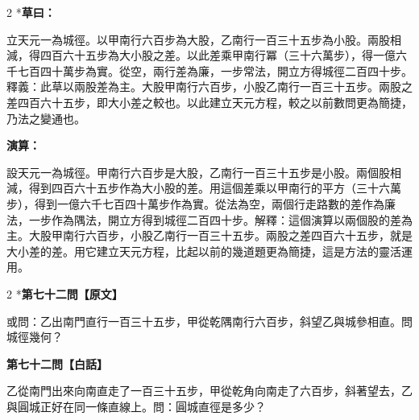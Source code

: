 \documentclass[11pt,a4paper]{article}
\begin{document}
\vspace{0.1cm}
\noindent{}
\par\vspace{0.15cm}

\begin{paracol}{2}
\switchcolumn[0]*\textbf{草曰：}

\small 立天元一為城徑。以甲南行六百步為大股，乙南行一百三十五步為小股。兩股相減，得四百六十五步為大小股之差。以此差乘甲南行冪（三十六萬步），得一億六千七百四十萬步為實。從空，兩行差為廉，一步常法，開立方得城徑二百四十步。釋義：此草以兩股差為主。大股甲南行六百步，小股乙南行一百三十五步。兩股之差四百六十五步，即大小差之較也。以此建立天元方程，較之以前數問更為簡捷，乃法之變通也。

\switchcolumn\textbf{演算：}

\small 設天元一為城徑。甲南行六百步是大股，乙南行一百三十五步是小股。兩個股相減，得到四百六十五步作為大小股的差。用這個差乘以甲南行的平方（三十六萬步），得到一億六千七百四十萬步作為實。從法為空，兩個行走路數的差作為廉法，一步作為隅法，開立方得到城徑二百四十步。解釋：這個演算以兩個股的差為主。大股甲南行六百步，小股乙南行一百三十五步。兩股之差四百六十五步，就是大小差的差。用它建立天元方程，比起以前的幾道題更為簡捷，這是方法的靈活運用。
\end{paracol}

\vspace{0.1cm}
\noindent{}
\par\vspace{0.3cm}

\begin{paracol}{2}
\switchcolumn[0]*\noindent\textbf{第七十二問【原文】}

\small 或問：乙出南門直行一百三十五步，甲從乾隅南行六百步，斜望乙與城參相直。問城徑幾何？

\switchcolumn\noindent\textbf{第七十二問【白話】}

\small 乙從南門出來向南直走了一百三十五步，甲從乾角向南走了六百步，斜著望去，乙與圓城正好在同一條直線上。問：圓城直徑是多少？
\end{paracol}

\vspace{0.1cm}
\noindent{}
\par\vspace{0.15cm}
\end{document}
